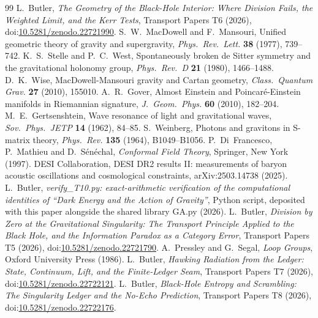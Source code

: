 \documentclass[11pt]{article}
\theoremstyle{definition}
\theoremstyle{plain}
\begin{document}
\begin{thebibliography}{99}
 L.~Butler,
\emph{The Geometry of the Black-Hole Interior: Where Division Fails, the Weighted Limit, and the Kerr Tests},
Transport Papers T6 (2026), doi:\href{https://doi.org/10.5281/zenodo.22721990}{10.5281/zenodo.22721990}.
 S.~W.~MacDowell and F.~Mansouri,
Unified geometric theory of gravity and supergravity,
\emph{Phys.\ Rev.\ Lett.} \textbf{38} (1977), 739--742.
 K.~S.~Stelle and P.~C.~West,
Spontaneously broken de Sitter symmetry and the gravitational holonomy group,
\emph{Phys.\ Rev.\ D} \textbf{21} (1980), 1466--1488.
 D.~K.~Wise,
MacDowell-Mansouri gravity and Cartan geometry,
\emph{Class.\ Quantum Grav.} \textbf{27} (2010), 155010.
 A.~R.~Gover,
Almost Einstein and Poincar\'e-Einstein manifolds in Riemannian signature,
\emph{J.\ Geom.\ Phys.} \textbf{60} (2010), 182--204.
 M.~E.~Gertsenshtein,
Wave resonance of light and gravitational waves,
\emph{Sov.\ Phys.\ JETP} \textbf{14} (1962), 84--85.
 S.~Weinberg,
Photons and gravitons in S-matrix theory,
\emph{Phys.\ Rev.} \textbf{135} (1964), B1049--B1056.
 P.~Di~Francesco, P.~Mathieu and D.~S\'en\'echal,
\emph{Conformal Field Theory},
Springer, New York (1997).
 DESI Collaboration,
DESI DR2 results II: measurements of baryon acoustic oscillations and cosmological constraints,
arXiv:2503.14738 (2025).
 L.~Butler,
\emph{verify\_T10.py: exact-arithmetic verification of the computational identities of ``Dark Energy and the Action of Gravity''},
Python script, deposited with this paper alongside the shared library GA.py (2026).
 L.~Butler,
\emph{Division by Zero at the Gravitational Singularity: The Transport Principle Applied to the Black Hole, and the Information Paradox as a Category Error},
Transport Papers T5 (2026), doi:\href{https://doi.org/10.5281/zenodo.22721790}{10.5281/zenodo.22721790}.
 A.~Pressley and G.~Segal,
\emph{Loop Groups},
Oxford University Press (1986).
 L.~Butler,
\emph{Hawking Radiation from the Ledger: State, Continuum, Lift, and the Finite-Ledger Seam},
Transport Papers T7 (2026), doi:\href{https://doi.org/10.5281/zenodo.22722121}{10.5281/zenodo.22722121}.
 L.~Butler,
\emph{Black-Hole Entropy and Scrambling: The Singularity Ledger and the No-Echo Prediction},
Transport Papers T8 (2026), doi:\href{https://doi.org/10.5281/zenodo.22722176}{10.5281/zenodo.22722176}.

\end{thebibliography}
\end{document}
